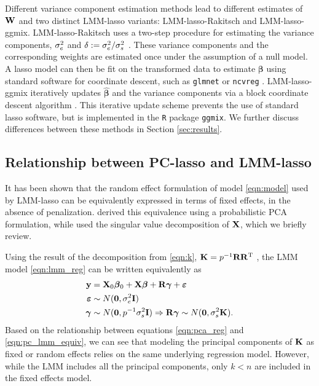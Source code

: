 Different variance component estimation methods lead to different estimates of $\mathbf{W}$ and two distinct LMM-lasso variants: LMM-lasso-Rakitsch and LMM-lasso-ggmix. LMM-lasso-Rakitsch uses a two-step procedure for estimating the variance components, $\sigma^2_e$ and $\delta := \sigma^2_e / \sigma^2_s$ \citep{rakitsch2013lasso}. These variance components and the corresponding weights are estimated once under the assumption of a null model. A lasso model can then be fit on the transformed data to estimate $\boldsymbol{\beta}$ using standard software for coordinate descent, such as \texttt{glmnet} \citep{glmnet} or \texttt{ncvreg} \citep{ncvreg}. LMM-lasso-ggmix iteratively updates $\widehat{\boldsymbol{\beta}}$ and the variance components via a block coordinate descent algorithm \citep{bhatnagar2020simultaneous}. This iterative update scheme prevents the use of standard lasso software, but is implemented in the \texttt{R} package \texttt{ggmix}.  We further discuss differences between these methods in Section \ref{sec:results}.

\subsection{Relationship between PC-lasso and LMM-lasso}

It has been shown that the random effect formulation of model \eqref{eqn:model} used by LMM-lasso can be equivalently expressed in terms of fixed effects, in the absence of penalization. \citet{zhang2015principal} derived this equivalence using a probabilistic PCA formulation, while \citet{hoffman2013correcting} used the singular value decomposition of $\mathbf{X}$, which we briefly review.

Using the result of the decomposition from \eqref{eqn:k}, $\mathbf{K} = p^{-1} \mathbf{R} \mathbf{R}^{\text{T}}$ , the LMM model \eqref{eqn:lmm_reg} can be written equivalently as
\begin{equation}
  \begin{aligned}
    \label{eqn:pc_lmm_equiv}
    \mathbf{y} &= \mathbf{X}_0 \boldsymbol{\beta}{}_0 + \mathbf{X} \boldsymbol{\beta}{} + \mathbf{R} \boldsymbol{\gamma} + \boldsymbol{\varepsilon}{} \\
    \boldsymbol{\varepsilon}{} &\sim N(\boldsymbol{0}, \sigma^2_e \mathbf{I}) \\
    \boldsymbol{\gamma} &\sim N(\boldsymbol{0}, p^{-1} \sigma^2_s \mathbf{I}) \Rightarrow \mathbf{R} \boldsymbol{\gamma} \sim N(\boldsymbol{0}, \sigma^2_s \mathbf{K}).
  \end{aligned}
\end{equation}
Based on the relationship between equations \eqref{eqn:pca_reg} and \eqref{eqn:pc_lmm_equiv}, we can see that modeling the principal components of $\mathbf{K}$ as fixed or random effects relies on the same underlying regression model. However, while the LMM includes all the principal components, only $k < n$ are included in the fixed effects model. 

